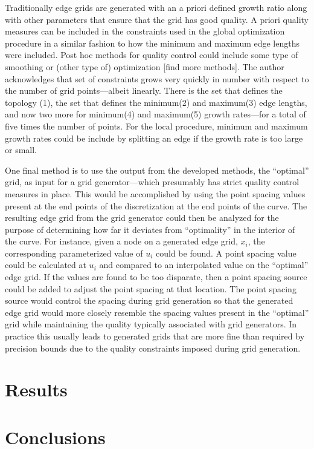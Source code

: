 \documentclass[preprint,12pt]{elsarticle}
\begin{document}
        Traditionally edge grids are generated with an a priori defined growth ratio along with other parameters that ensure that the grid has good quality.  A priori quality measures can be included in the constraints used in the global optimization procedure in a similar fashion to how the minimum and maximum edge lengths were included.  Post hoc methods for quality control could include some type of smoothing or (other type of) optimization [find more methods].  The author acknowledges that set of constraints grows very quickly in number with respect to the number of grid points—albeit linearly.  There is the set that defines the topology (1), the set that defines the minimum(2) and maximum(3) edge lengths, and now two more for minimum(4) and maximum(5) growth rates—for a total of five times the number of points.  For the local procedure, minimum and maximum growth rates could be include by splitting an edge if the growth rate is too large or small.

        One final method is to use the output from the developed methods, the “optimal” grid, as input for a grid generator—which presumably has strict quality control measures in place.  This would be accomplished by using the point spacing values present at the end points of the discretization at the end points of the curve.  The resulting edge grid from the grid generator could then be analyzed for the purpose of determining how far it deviates from “optimality” in the interior of the curve.  For instance, given a node on a generated edge grid, $x_i$, the corresponding parameterized value of $u_i$ could be found.  A point spacing value could be calculated at $u_i$ and compared to an interpolated value on the “optimal” edge grid.  If the values are found to be too disparate, then a point spacing source could be added to adjust the point spacing at that location.  The point spacing source would control the spacing during grid generation so that the generated edge grid would more closely resemble the spacing values present in the “optimal” grid while maintaining the quality typically associated with grid generators. In practice this usually leads to generated grids that are more fine than required by precision bounds due to the quality constraints imposed during grid generation.

\section{Results}

\section{Conclusions}
\end{document}
